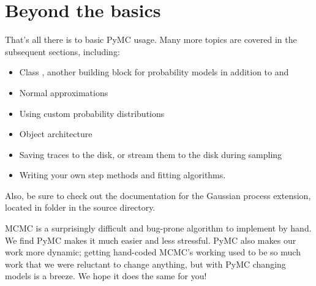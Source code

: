 \section*{Beyond the basics}
That's all there is to basic PyMC usage. Many more topics are covered in the subsequent sections, including:
\begin{itemize}
   \item Class , another building block for probability models in addition to  and 
   \item Normal approximations
   \item Using custom probability distributions
   \item Object architecture
   \item Saving traces to the disk, or stream them to the disk during sampling
   \item Writing your own step methods and fitting algorithms.
\end{itemize}
Also, be sure to check out the documentation for the Gaussian process extension, located in folder  in the source directory. 

\bigskip
MCMC is a surprisingly difficult and bug-prone algorithm to implement by hand. We find PyMC makes it much easier and less stressful. PyMC also makes our work more dynamic; getting hand-coded MCMC's working used to be so much work that we were reluctant to change anything, but with PyMC changing models is a breeze. We hope it does the same for you!